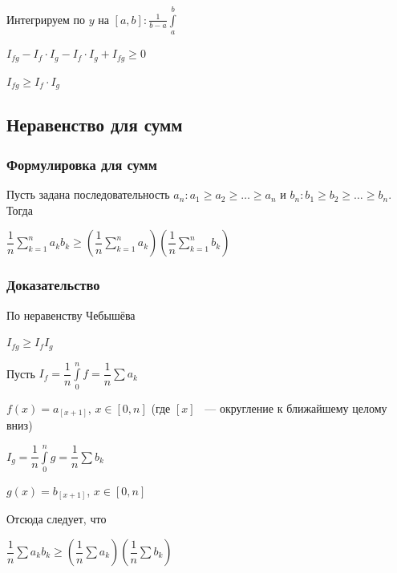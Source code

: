 \documentclass{article}
\begin{document}
                Интегрируем по $y$ на $[a, b] : \frac{1}{b - a} \int\limits^b_a$
			
                $I_{fg} - I_f \cdot I_g - I_f \cdot I_g + I_{fg} \geq 0$
			
                $I_{fg} \geq I_f \cdot I_g$
                
        \subsection{Неравенство для сумм}
        
            \subsubsection{Формулировка для сумм}
            
                Пусть задана последовательность $a_n : a_1 \geq a_2 \geq \ldots \geq a_n$ и $b_n : b_1 \geq b_2 \geq \ldots \geq b_n$. Тогда
                
                $\dfrac{1}{n} \sum\limits^n_{k = 1} a_k b_k \geq \left( \dfrac{1}{n} \sum\limits^n_{k = 1} a_k \right) \left( \dfrac{1}{n} \sum\limits^n_{k = 1} b_k \right)$
                
            \subsubsection{Доказательство}
            
                По неравенству Чебышёва
                
                $I_{fg} \geq I_f I_g$
                
                Пусть $I_f = \dfrac{1}{n} \int\limits^n_0 f = \dfrac{1}{n} \sum a_k$
                
                $f(x) = a_{[x + 1]}$, $x \in [0, n]$ (где $[x]$ ~--- округление к ближайшему целому вниз)
                
                $I_g = \dfrac{1}{n} \int\limits^n_0 g = \dfrac{1}{n} \sum b_k$
                
                $g(x) = b_{[x + 1]}$, $x \in [0, n]$
                
                Отсюда следует, что
                
                $\dfrac{1}{n} \sum a_k b_k \geq \left( \dfrac{1}{n} \sum a_k \right) \left( \dfrac{1}{n} \sum b_k \right)$
                
	\newpage
	
\end{document}
